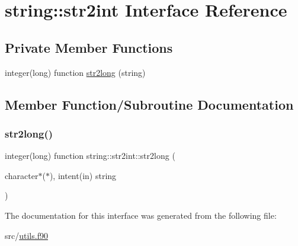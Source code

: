 \hypertarget{interfacestring_1_1str2int}{}\section{string\+:\+:str2int Interface Reference}
\label{interfacestring_1_1str2int}
\subsection*{Private Member Functions}
\begin{DoxyCompactItemize}
\item 
integer(long) function \hyperlink{interfacestring_1_1str2int_a690e8211dca5e470af99ef0aa0dbe80c}{str2long} (string)
\end{DoxyCompactItemize}


\subsection{Member Function/\+Subroutine Documentation}
\mbox{\label{interfacestring_1_1str2int_a690e8211dca5e470af99ef0aa0dbe80c}} 
\subsubsection{\texorpdfstring{str2long()}{str2long()}}
{\footnotesize\ttfamily integer(long) function string\+::str2int\+::str2long (\begin{DoxyParamCaption}\item[{character$\ast$($\ast$), intent(in)}]{string }\end{DoxyParamCaption})\hspace{0.3cm}{\ttfamily [private]}}



The documentation for this interface was generated from the following file\+:\begin{DoxyCompactItemize}
\item 
src/\hyperlink{utils_8f90}{utils.\+f90}\end{DoxyCompactItemize}
